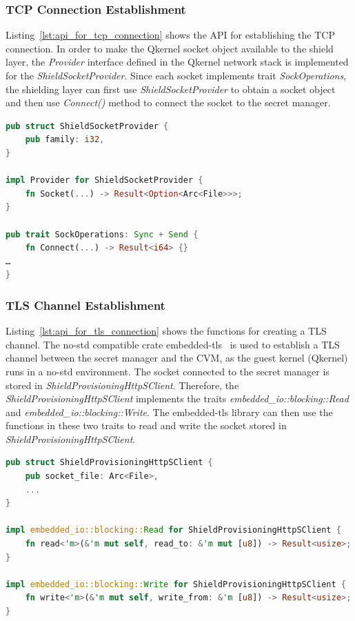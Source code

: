 \subsubsection{TCP Connection Establishment}

Listing~\ref{lst:api_for_tcp_connection} shows the API for establishing the TCP connection. In order to make the Qkernel socket object available to the shield layer, the \emph{Provider} interface defined in the Qkernel network stack is implemented for the \emph{ShieldSocketProvider}. Since each 
socket implements trait \emph{SockOperations}, the shielding layer can first use \emph{ShieldSocketProvider} to obtain a socket object and then use \emph{Connect()} method to connect the socket to the secret manager.

\begin{lstlisting}[language=rust, caption= API for establishing the TCP connection, label={lst:api_for_tcp_connection}]
pub struct ShieldSocketProvider {
    pub family: i32,
}

impl Provider for ShieldSocketProvider {
    fn Socket(...) -> Result<Option<Arc<File>>>;
}

pub trait SockOperations: Sync + Send {
    fn Connect(...) -> Result<i64> {}
…
}    
\end{lstlisting}

\subsubsection{TLS Channel Establishment}
Listing~\ref{lst:api_for_tls_connection} shows the functions for creating a TLS channel. The no-std compatible crate embedded-tls~\cite*{embede_tls} is used to establish a TLS channel between the secret manager and the \acrshort{CVM}, as the guest kernel (Qkernel) runs in a no-std environment. The 
socket connected to the secret manager is stored in \emph{ShieldProvisioningHttpSClient}. Therefore, the \emph{ShieldProvisioningHttpSClient} implements the traits \emph{embedded\_io::blocking::Read} and \emph{embedded\_io::blocking::Write}. The embedded-tls library can then use the functions 
in these two traits to read and write the socket stored in \emph{ShieldProvisioningHttpSClient}.

\begin{lstlisting}[language=rust, caption= API for establishing the TLS channel, label={lst:api_for_tls_connection}]
pub struct ShieldProvisioningHttpSClient {
    pub socket_file: Arc<File>,
    ...
}

impl embedded_io::blocking::Read for ShieldProvisioningHttpSClient {
    fn read<'m>(&'m mut self, read_to: &'m mut [u8]) -> Result<usize>;
}

impl embedded_io::blocking::Write for ShieldProvisioningHttpSClient {
    fn write<'m>(&'m mut self, write_from: &'m [u8]) -> Result<usize>;
}
\end{lstlisting}
